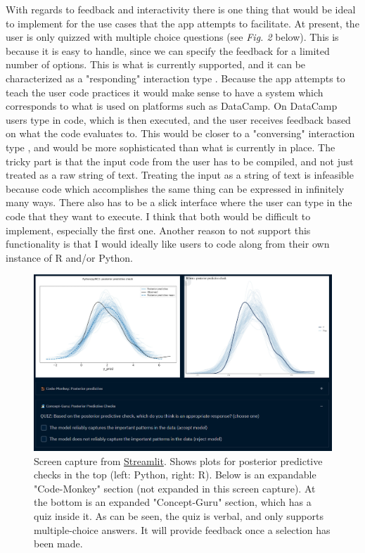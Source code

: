 \documentclass[12pt]{article}
\begin{document}
With regards to feedback and interactivity there is one thing that would be ideal
to implement for the use cases that the app attempts to facilitate. At present,
the user is only quizzed with multiple choice questions (see \emph{Fig. 2}
below). This is because it is easy
to handle, since we can specify the feedback for a limited number of options.
This is what is currently supported, and it can be characterized as a
"responding" interaction type \autocite[81]{rogers2011interaction}.
Because the app attempts to teach the user code practices it would make sense to
have a system which corresponds to what is used on platforms such as DataCamp.
On DataCamp users type in code, which is then executed, and the user receives feedback
based on what the code evaluates to. This would be closer to a "conversing"
interaction type \autocite[81]{rogers2011interaction},
and would be more sophisticated than what is currently in
place. The tricky part is that the input code from the user has to be
compiled,
and not just treated as a raw string of text. Treating the input as a string
of text is infeasible because code which accomplishes the same thing can be
expressed in infinitely many ways.
There also has to be a slick interface where the user can type in the code that
they want to execute. I think that both would be difficult to implement, especially the
first one. Another reason to not support this functionality is that I would ideally
like users to code along from their own instance of R and/or Python.

\begin{figure}[H]
    \centerline{\includegraphics[scale = 0.5]{../img/Quiz-image.png}}
    \caption{Screen capture from
    \href{https://share.streamlit.io/victor-m-p/bayesworkflow/main/BayesWorkflow.py}{Streamlit}.
    Shows plots for posterior predictive checks in the top (left: Python,
    right: R). Below is an expandable "Code-Monkey" section (not expanded
    in this screen capture). At the bottom is
    an expanded "Concept-Guru" section, which has a quiz inside it.
    As can be seen, the quiz is verbal, and only supports multiple-choice answers.
    It will provide feedback once a selection has been made.
    }
\end{figure}
\end{document}
